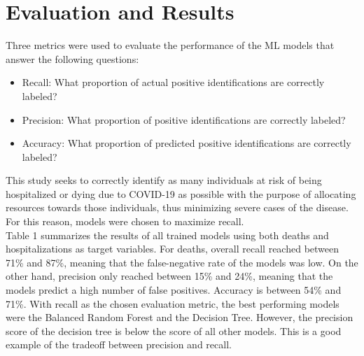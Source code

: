 \documentclass[hidelinks,10pt]{article}
\begin{document}
	\section{Evaluation and Results}\label{sec_results}
	Three metrics were used to evaluate the performance of the ML models that answer the following questions:
	\begin{itemize}
		\item Recall: What proportion of actual positive identifications are correctly labeled?
		\item Precision: What proportion of positive identifications are correctly labeled?
		\item Accuracy: What proportion of predicted positive identifications are correctly labeled?
	\end{itemize}
This study seeks to correctly identify as many individuals at risk of being hospitalized or dying due to COVID-19 as possible with the purpose of allocating resources towards those individuals, thus minimizing severe cases of the disease.  For this reason, models were chosen to maximize recall.\\
Table 1 summarizes the results of all trained models using both deaths and hospitalizations as target variables. For deaths, overall recall reached between 71\% and 87\%, meaning that the false-negative rate of the models was low. On the other hand, precision only reached between 15\% and 24\%, meaning that the models predict a high number of false positives. Accuracy is between 54\% and 71\%. With recall as the chosen evaluation metric, the best performing models were the Balanced Random Forest and the Decision Tree. However, the precision score of the decision tree is below the score of all other models. This is a good example of the tradeoff between precision and recall.\\
\end{document}
